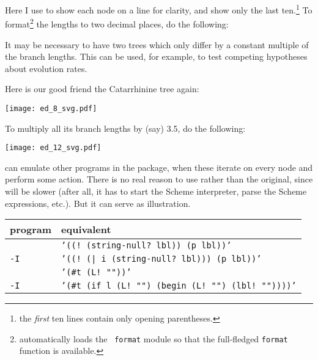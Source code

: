 
\begin{samepage}

\end{samepage}

\noindent{}Here I use \nwindent{} to show each node on a line for clarity, and
show only the last ten.\footnote{the \emph{first} ten lines contain only
opening parentheses.} To format\footnote{\sched{} automatically loads the {\tt
format} module so that the full-fledged {\tt format} function is available.}
the lengths to two decimal places, do the following:


\begin{samepage}

\end{samepage}

\begin{samepage}

It may be necessary to have two trees which only differ by a constant multiple
of the branch lengths. This can be used, for example, to test competing
hypotheses about evolution rates.
\end{samepage}
Here is our good friend the Catarrhinine tree again:


\begin{center}
\texttt{[image: ed\_8\_svg.pdf]}
\end{center}

To multiply all its branch lengths by (say) 3.5, do the following:


\begin{center}
\texttt{[image: ed\_12\_svg.pdf]}
\end{center}

\begin{samepage}

\noindent{}\sched{} can emulate other programs in the package, when these
iterate on every node and perform some action. There is no real reason to use
\sched{} rather than the original, since \sched{} will be slower (after all, it
has to start the Scheme interpreter, parse the Scheme expressions, etc.). But it
can serve as illustration.
\end{samepage}

\begin{center}
\begin{tabular}{ll}
program & \sched{} equivalent \\
\hline
{}{} 						& {\tt '((! (string-null? lbl)) (p lbl))'}  \\
{} {\tt -I} 		& {\tt '((! (| i (string-null? lbl))) (p lbl))'} \\
\topology{}						& {\tt '(\#t (L! ""))'} \\
\topology{} {\tt -I} 	& {\tt '(\#t (if l (L! "") (begin (L! "") (lbl!  ""))))'}
\end{tabular}
\end{center}

